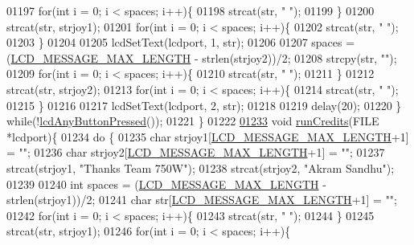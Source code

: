 \begin{DoxyCode}
{{{{{{{{{{{{{{{{01197         \textcolor{keywordflow}{for}(\textcolor{keywordtype}{int} i = 0; i < spaces; i++)\{
01198             strcat(str, \textcolor{stringliteral}{" "});
01199         \}
01200         strcat(str, strjoy1);
01201         \textcolor{keywordflow}{for}(\textcolor{keywordtype}{int} i = 0; i < spaces; i++)\{
01202             strcat(str, \textcolor{stringliteral}{" "});
01203         \}
01204 
01205         lcdSetText(lcdport, 1, str);
01206 
01207         spaces = (\hyperlink{lcdmsg_8h_abe4c4b70fc6f44ae3680e5b2c68cdd00}{LCD\_MESSAGE\_MAX\_LENGTH} - strlen(strjoy2))/2;
01208         strcpy(str, \textcolor{stringliteral}{""});
01209         \textcolor{keywordflow}{for}(\textcolor{keywordtype}{int} i = 0; i < spaces; i++)\{
01210             strcat(str, \textcolor{stringliteral}{" "});
01211         \}
01212         strcat(str, strjoy2);
01213         \textcolor{keywordflow}{for}(\textcolor{keywordtype}{int} i = 0; i < spaces; i++)\{
01214             strcat(str, \textcolor{stringliteral}{" "});
01215         \}
01216 
01217         lcdSetText(lcdport, 2, str);
01218 
01219         delay(20);
01220     \} \textcolor{keywordflow}{while}(!\hyperlink{lcddiag_8h_a0592813f995bfeeadb9bee923833ed35}{lcdAnyButtonPressed}());
01221 \}
01222 
\hypertarget{lcddiag_8c_source.tex_l01233}{}\hyperlink{lcddiag_8c_a636890926de259e3f0869b8f4c4789c3}{01233} \textcolor{keywordtype}{void} \hyperlink{lcddiag_8c_a636890926de259e3f0869b8f4c4789c3}{runCredits}(FILE *lcdport)\{
01234     \textcolor{keywordflow}{do} \{
01235         \textcolor{keywordtype}{char} strjoy1[\hyperlink{lcdmsg_8h_abe4c4b70fc6f44ae3680e5b2c68cdd00}{LCD\_MESSAGE\_MAX\_LENGTH}+1] = \textcolor{stringliteral}{""};
01236         \textcolor{keywordtype}{char} strjoy2[\hyperlink{lcdmsg_8h_abe4c4b70fc6f44ae3680e5b2c68cdd00}{LCD\_MESSAGE\_MAX\_LENGTH}+1] = \textcolor{stringliteral}{""};
01237         strcat(strjoy1, \textcolor{stringliteral}{"Thanks Team 750W"});
01238         strcat(strjoy2, \textcolor{stringliteral}{"Akram Sandhu"});
01239 
01240         \textcolor{keywordtype}{int} spaces = (\hyperlink{lcdmsg_8h_abe4c4b70fc6f44ae3680e5b2c68cdd00}{LCD\_MESSAGE\_MAX\_LENGTH} - strlen(strjoy1))/2;
01241         \textcolor{keywordtype}{char} str[\hyperlink{lcdmsg_8h_abe4c4b70fc6f44ae3680e5b2c68cdd00}{LCD\_MESSAGE\_MAX\_LENGTH}+1] = \textcolor{stringliteral}{""};
01242         \textcolor{keywordflow}{for}(\textcolor{keywordtype}{int} i = 0; i < spaces; i++)\{
01243             strcat(str, \textcolor{stringliteral}{" "});
01244         \}
01245         strcat(str, strjoy1);
01246         \textcolor{keywordflow}{for}(\textcolor{keywordtype}{int} i = 0; i < spaces; i++)\{
}}}}}}}}}}}}}}}}
\end{DoxyCode}
